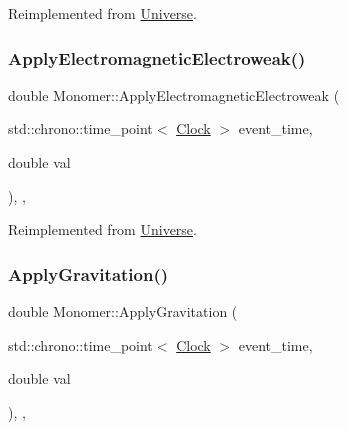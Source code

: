 Reimplemented from \mbox{\hyperlink{classUniverse_a1f787da78fa196ba635db21a9e91dabb}{Universe}}.

\mbox{\label{classMonomer_a4c3f9894ea57047789bec32602f033cb}} 
\subsubsection{\texorpdfstring{Apply\+Electromagnetic\+Electroweak()}{ApplyElectromagneticElectroweak()}}
{\footnotesize\ttfamily double Monomer\+::\+Apply\+Electromagnetic\+Electroweak (\begin{DoxyParamCaption}\item[{std\+::chrono\+::time\+\_\+point$<$ \mbox{\hyperlink{universe_8h_a0ef8d951d1ca5ab3cfaf7ab4c7a6fd80}{Clock}} $>$}]{event\+\_\+time,  }\item[{double}]{val }\end{DoxyParamCaption})\hspace{0.3cm}{\ttfamily [inline]}, {\ttfamily [final]}, {\ttfamily [virtual]}}



Reimplemented from \mbox{\hyperlink{classUniverse_a4c36c1ab30db993307f88363dde5e8c5}{Universe}}.

\mbox{\label{classMonomer_a8747945cc2f7abd7ce0885345ad14ebc}} 
\subsubsection{\texorpdfstring{Apply\+Gravitation()}{ApplyGravitation()}}
{\footnotesize\ttfamily double Monomer\+::\+Apply\+Gravitation (\begin{DoxyParamCaption}\item[{std\+::chrono\+::time\+\_\+point$<$ \mbox{\hyperlink{universe_8h_a0ef8d951d1ca5ab3cfaf7ab4c7a6fd80}{Clock}} $>$}]{event\+\_\+time,  }\item[{double}]{val }\end{DoxyParamCaption})\hspace{0.3cm}{\ttfamily [inline]}, {\ttfamily [final]}, {\ttfamily [virtual]}}



